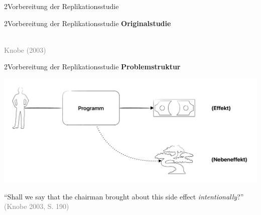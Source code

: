 \documentclass[xcolor=table,9pt,aspectratio=169]{beamer}
\begin{document}
\begin{frame}
\begin{overlayarea}{\textwidth}{0.81\paperheight}{
   \vspace*{11mm}
   \textcolor{uolblue}
   {2\hspace*{1em}Vorbereitung der Replikationsstudie}
}
\end{overlayarea}
\end{frame}


\begin{frame}{\vspace*{10mm}2\hspace*{1em}Vorbereitung der Replikationsstudie}
\textbf{Originalstudie}\\
\begin{center}
   \\
   \textcolor{gray}{Knobe (2003)}
\end{center}
\end{frame}


\begin{frame}{\vspace*{10mm}2\hspace*{1em}Vorbereitung der Replikationsstudie}
\textbf{Problemstruktur}\\
\begin{center}
   \includegraphics[width=0.75\linewidth]{figures/replication_knobe_structure.pdf}\\
\end{center}
\enquote{Shall we say that the chairman brought about this side effect \textit{intentionally}?}\\
\textcolor{gray}{(Knobe 2003, S. 190)}
\bigskip
\end{frame}
\end{document}
